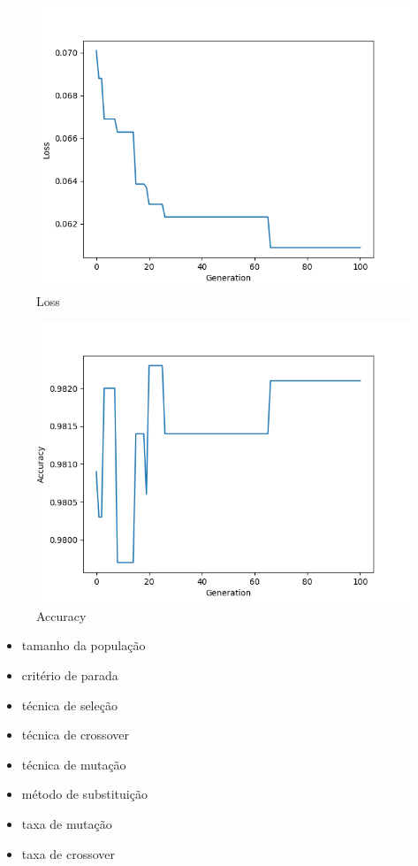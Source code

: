 \documentclass[twoside,conference,a4paper]{IEEEtran}
\begin{document}
\begin{figure}[htbp]
        \centering \includegraphics[width=1\columnwidth]{./ia_proj_images/mnist/3/loss.png}
        \caption{
                \label{fig:loss_mnist_03}
                Loss
        }
\end{figure}
\begin{figure}[htbp]
        \centering \includegraphics[width=1\columnwidth]{./ia_proj_images/mnist/3/acc.png}
        \caption{
                \label{fig:acc_mnist_03}
                Accuracy
        }
\end{figure}


\begin{itemize}
    \item tamanho da população
    \item critério de parada
    \item técnica de seleção
    \item técnica de crossover
    \item técnica de mutação
    \item método de substituição
    \item taxa de mutação
    \item taxa de crossover
\end{itemize}
\end{document}

